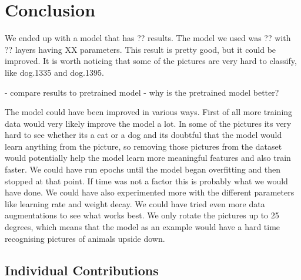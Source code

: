 \section{Conclusion}
We ended up with a model that has ?? results. The model we used was ?? with ?? layers having XX parameters. This result is pretty good, but it could be improved. It is worth noticing that some of the pictures are very hard to classify, like dog.1335 and dog.1395.

- compare results to pretrained model - why is the pretrained model better?


The model could have been improved in various ways.
First of all more training data would very likely improve the model a lot. In some of the pictures its very hard to see whether its a cat or a dog and its doubtful that the model would learn anything from the picture, so removing those pictures from the dataset would potentially help the model learn more meaningful features and also train faster.
We could have run epochs until the model began overfitting and then stopped at that point. If time was not a factor this is probably what we would have done.
We could have also experimented more with the different parameters like learning rate and weight decay. 
We could have tried even more data augmentations to see what works best. We only rotate the pictures up to 25 degrees, which means that the model as an example would have a hard time recognising pictures of animals upside down.


\subsection{Individual Contributions}

